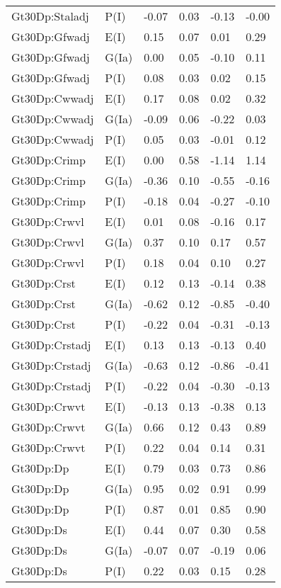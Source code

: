 \begin{center}
\begin{longtable}{|p{1.1in}|p{0.7in}|p{0.7in}|p{0.6in}|p{0.6in}|p{0.6in}|}
  Gt30Dp:Staladj & P(I) & -0.07 & 0.03 & -0.13 & -0.00 \\ 
  Gt30Dp:Gfwadj & E(I) & 0.15 & 0.07 & 0.01 & 0.29 \\ 
  Gt30Dp:Gfwadj & G(Ia) & 0.00 & 0.05 & -0.10 & 0.11 \\ 
  Gt30Dp:Gfwadj & P(I) & 0.08 & 0.03 & 0.02 & 0.15 \\ 
  Gt30Dp:Cwwadj & E(I) & 0.17 & 0.08 & 0.02 & 0.32 \\ 
  Gt30Dp:Cwwadj & G(Ia) & -0.09 & 0.06 & -0.22 & 0.03 \\ 
  Gt30Dp:Cwwadj & P(I) & 0.05 & 0.03 & -0.01 & 0.12 \\ 
  Gt30Dp:Crimp & E(I) & 0.00 & 0.58 & -1.14 & 1.14 \\ 
  Gt30Dp:Crimp & G(Ia) & -0.36 & 0.10 & -0.55 & -0.16 \\ 
  Gt30Dp:Crimp & P(I) & -0.18 & 0.04 & -0.27 & -0.10 \\ 
  Gt30Dp:Crwvl & E(I) & 0.01 & 0.08 & -0.16 & 0.17 \\ 
  Gt30Dp:Crwvl & G(Ia) & 0.37 & 0.10 & 0.17 & 0.57 \\ 
  Gt30Dp:Crwvl & P(I) & 0.18 & 0.04 & 0.10 & 0.27 \\ 
  Gt30Dp:Crst & E(I) & 0.12 & 0.13 & -0.14 & 0.38 \\ 
  Gt30Dp:Crst & G(Ia) & -0.62 & 0.12 & -0.85 & -0.40 \\ 
  Gt30Dp:Crst & P(I) & -0.22 & 0.04 & -0.31 & -0.13 \\ 
  Gt30Dp:Crstadj & E(I) & 0.13 & 0.13 & -0.13 & 0.40 \\ 
  Gt30Dp:Crstadj & G(Ia) & -0.63 & 0.12 & -0.86 & -0.41 \\ 
  Gt30Dp:Crstadj & P(I) & -0.22 & 0.04 & -0.30 & -0.13 \\ 
  Gt30Dp:Crwvt & E(I) & -0.13 & 0.13 & -0.38 & 0.13 \\ 
  Gt30Dp:Crwvt & G(Ia) & 0.66 & 0.12 & 0.43 & 0.89 \\ 
  Gt30Dp:Crwvt & P(I) & 0.22 & 0.04 & 0.14 & 0.31 \\ 
  Gt30Dp:Dp & E(I) & 0.79 & 0.03 & 0.73 & 0.86 \\ 
  Gt30Dp:Dp & G(Ia) & 0.95 & 0.02 & 0.91 & 0.99 \\ 
  Gt30Dp:Dp & P(I) & 0.87 & 0.01 & 0.85 & 0.90 \\ 
  Gt30Dp:Ds & E(I) & 0.44 & 0.07 & 0.30 & 0.58 \\ 
  Gt30Dp:Ds & G(Ia) & -0.07 & 0.07 & -0.19 & 0.06 \\ 
  Gt30Dp:Ds & P(I) & 0.22 & 0.03 & 0.15 & 0.28 \\ 

\end{longtable}
\end{center}
